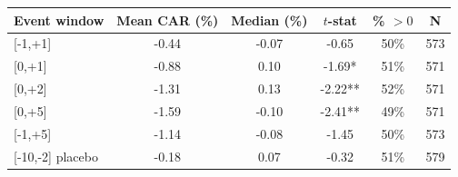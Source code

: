 \begin{tabular}{lccccc}
\toprule
Event window & Mean CAR (\%) & Median (\%) & $t$-stat & \% $>0$ & N \\
\midrule
{[-1,+1]} & -0.44 & -0.07 & -0.65 & 50\% & 573 \\
{[0,+1]} & -0.88 & 0.10 & -1.69* & 51\% & 571 \\
{[0,+2]} & -1.31 & 0.13 & -2.22** & 52\% & 571 \\
{[0,+5]} & -1.59 & -0.10 & -2.41** & 49\% & 571 \\
{[-1,+5]} & -1.14 & -0.08 & -1.45 & 50\% & 573 \\
{[-10,-2] placebo} & -0.18 & 0.07 & -0.32 & 51\% & 579 \\
\bottomrule
\end{tabular}